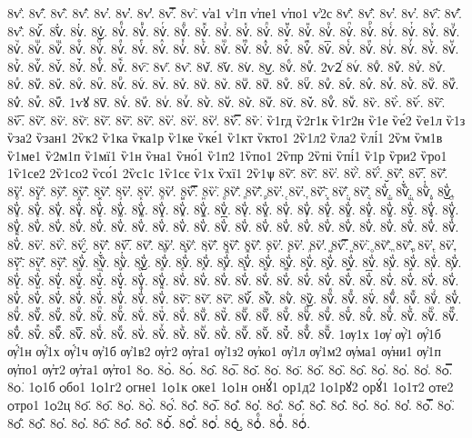 {8ѵ҆̈.
8ѵ҆̋.
8ѵ҆̏.
8ѵ҆̑.
8ѵ҆̓.
8ѵ҆̔.
8ѵ҆̾.
8ѵ҆̿.
8ѵ҆͘.
ѵ҆а1
ѵ҆1п
ѵ҆пе1
ѵ҆по1
ѵ҆2с
8ѵ҆҃.
8ѵ҆҄.
8ѵ҆҅.
8ѵ҆҆.
8ѵ҆҇.
8ѵ҆᷀.
8ѵ҆᷁.
8ѵ҆᷶.
8ѵ᷷҆.
8ѵ᷸҆.
8ѵ᷹҆.
8ѵ҆ⷠ.
8ѵ҆ⷡ.
8ѵ҆ⷢ.
8ѵ҆ⷣ.
8ѵ҆ⷤ.
8ѵ҆ⷥ.
8ѵ҆ⷦ.
8ѵ҆ⷧ.
8ѵ҆ⷨ.
8ѵ҆ⷩ.
8ѵ҆ⷪ.
8ѵ҆ⷫ.
8ѵ҆ⷬ.
8ѵ҆ⷭ.
8ѵ҆ⷮ.
8ѵ҆ⷯ.
8ѵ҆ⷰ.
8ѵ҆ⷱ.
8ѵ҆ⷲ.
8ѵ҆ⷳ.
8ѵ҆ⷴ.
8ѵ҆ⷵ.
8ѵ҆ⷶ.
8ѵ҆ⷷ.
8ѵ҆ⷸ.
8ѵ҆ⷹ.
8ѵ҆ⷺ.
8ѵ҆ⷻ.
8ѵ҆ⷼ.
8ѵ҆ⷽ.
8ѵ҆ⷾ.
8ѵ҆ⷿ.
8ѵ҆꙯.
8ѵ҆ꙴ.
8ѵ҆ꙵ.
8ѵ҆ꙶ.
8ѵ҆ꙷ.
8ѵ҆ꙸ.
8ѵ҆ꙹ.
8ѵ҆ꙺ.
8ѵ҆ꙻ.
8ѵ҆꙼.
8ѵ҆꙽.
8ѵ҆ꚞ.
8ѵ҆ꚟ.
8ѵ҇.
8ѵ᷀.
8ѵ᷁.
8ѵ᷶.
8ѵ᷷.
8ѵ᷸.
8ѵ᷹.
8ѵⷠ.
8ѵⷡ.
2ѵ2ⷢ
8ѵⷢ.
8ѵⷣ.
8ѵⷤ.
8ѵⷥ.
8ѵⷦ.
8ѵⷧ.
8ѵⷨ.
8ѵⷩ.
8ѵⷪ.
8ѵⷫ.
8ѵⷬ.
8ѵⷭ.
8ѵⷮ.
8ѵⷯ.
8ѵⷰ.
8ѵⷱ.
8ѵⷲ.
8ѵⷳ.
8ѵⷴ.
8ѵⷵ.
8ѵⷶ.
8ѵⷷ.
8ѵⷸ.
8ѵⷹ.
8ѵⷺ.
8ѵⷻ.
8ѵⷼ.
8ѵⷽ.
8ѵⷾ.
8ѵⷿ.
1ѵꙋ
8ѵ꙯.
8ѵꙴ.
8ѵꙵ.
8ѵꙶ.
8ѵꙷ.
8ѵꙸ.
8ѵꙹ.
8ѵꙺ.
8ѵꙻ.
8ѵ꙼.
8ѵ꙽.
8ѵꚞ.
8ѵꚟ.
8ѷ.
8ѷ̀.
8ѷ́.
8ѷ̂.
8ѷ̅.
8ѷ̆.
8ѷ̇.
8ѷ̈.
8ѷ̋.
8ѷ̏.
8ѷ̑.
8ѷ̓.
8ѷ̔.
8ѷ̾.
8ѷ̿.
8ѷ͘.
ѷ1гд
ѷ2г1к
ѷ1г2н
ѷ1е
ѷе́2
ѷе1л
ѷ1з
ѷза2
ѷзан1
2ѷк2
ѷ1ка
ѷка1р
ѷ1ке
ѷке́1
ѷ1кт
ѷкто1
2ѷ1л2
ѷла2
ѷлі́1
2ѷм
ѷм1в
ѷ1ме1
ѷ2м1п
ѷ1мї1
ѷ1н
ѷна1
ѷно́1
ѷ1п2
1ѷпо1
2ѷпр
2ѷпі
ѷпі́1
ѷ1р
ѷри2
ѷро1
1ѷ1се2
2ѷ1со2
ѷсо́1
2ѷс1с
1ѷ1сє
ѷ1х
ѷхї1
2ѷ1ѱ
8ѷ҃.
8ѷ҄.
8ѷ҅.
8ѷ҅̀.
8ѷ҅́.
8ѷ҅̂.
8ѷ҅̅.
8ѷ҅̆.
8ѷ҅̇.
8ѷ҅̈.
8ѷ҅̋.
8ѷ҅̏.
8ѷ҅̑.
8ѷ҅̓.
8ѷ҅̔.
8ѷ҅̾.
8ѷ҅̿.
8ѷ҅͘.
8ѷ҅҃.
8ѷ҅҄.
8ѷ҅҅.
8ѷ҅҆.
8ѷ҅҇.
8ѷ҅᷀.
8ѷ҅᷁.
8ѷ҅᷶.
8ѷ᷷҅.
8ѷ᷸҅.
8ѷ᷹҅.
8ѷ҅ⷠ.
8ѷ҅ⷡ.
8ѷ҅ⷢ.
8ѷ҅ⷣ.
8ѷ҅ⷤ.
8ѷ҅ⷥ.
8ѷ҅ⷦ.
8ѷ҅ⷧ.
8ѷ҅ⷨ.
8ѷ҅ⷩ.
8ѷ҅ⷪ.
8ѷ҅ⷫ.
8ѷ҅ⷬ.
8ѷ҅ⷭ.
8ѷ҅ⷮ.
8ѷ҅ⷯ.
8ѷ҅ⷰ.
8ѷ҅ⷱ.
8ѷ҅ⷲ.
8ѷ҅ⷳ.
8ѷ҅ⷴ.
8ѷ҅ⷵ.
8ѷ҅ⷶ.
8ѷ҅ⷷ.
8ѷ҅ⷸ.
8ѷ҅ⷹ.
8ѷ҅ⷺ.
8ѷ҅ⷻ.
8ѷ҅ⷼ.
8ѷ҅ⷽ.
8ѷ҅ⷾ.
8ѷ҅ⷿ.
8ѷ҅꙯.
8ѷ҅ꙴ.
8ѷ҅ꙵ.
8ѷ҅ꙶ.
8ѷ҅ꙷ.
8ѷ҅ꙸ.
8ѷ҅ꙹ.
8ѷ҅ꙺ.
8ѷ҅ꙻ.
8ѷ҅꙼.
8ѷ҅꙽.
8ѷ҅ꚞ.
8ѷ҅ꚟ.
8ѷ҆.
8ѷ҆̀.
8ѷ҆́.
8ѷ҆̂.
8ѷ҆̅.
8ѷ҆̆.
8ѷ҆̇.
8ѷ҆̈.
8ѷ҆̋.
8ѷ҆̏.
8ѷ҆̑.
8ѷ҆̓.
8ѷ҆̔.
8ѷ҆̾.
8ѷ҆̿.
8ѷ҆͘.
8ѷ҆҃.
8ѷ҆҄.
8ѷ҆҅.
8ѷ҆҆.
8ѷ҆҇.
8ѷ҆᷀.
8ѷ҆᷁.
8ѷ҆᷶.
8ѷ᷷҆.
8ѷ᷸҆.
8ѷ᷹҆.
8ѷ҆ⷠ.
8ѷ҆ⷡ.
8ѷ҆ⷢ.
8ѷ҆ⷣ.
8ѷ҆ⷤ.
8ѷ҆ⷥ.
8ѷ҆ⷦ.
8ѷ҆ⷧ.
8ѷ҆ⷨ.
8ѷ҆ⷩ.
8ѷ҆ⷪ.
8ѷ҆ⷫ.
8ѷ҆ⷬ.
8ѷ҆ⷭ.
8ѷ҆ⷮ.
8ѷ҆ⷯ.
8ѷ҆ⷰ.
8ѷ҆ⷱ.
8ѷ҆ⷲ.
8ѷ҆ⷳ.
8ѷ҆ⷴ.
8ѷ҆ⷵ.
8ѷ҆ⷶ.
8ѷ҆ⷷ.
8ѷ҆ⷸ.
8ѷ҆ⷹ.
8ѷ҆ⷺ.
8ѷ҆ⷻ.
8ѷ҆ⷼ.
8ѷ҆ⷽ.
8ѷ҆ⷾ.
8ѷ҆ⷿ.
8ѷ҆꙯.
8ѷ҆ꙴ.
8ѷ҆ꙵ.
8ѷ҆ꙶ.
8ѷ҆ꙷ.
8ѷ҆ꙸ.
8ѷ҆ꙹ.
8ѷ҆ꙺ.
8ѷ҆ꙻ.
8ѷ҆꙼.
8ѷ҆꙽.
8ѷ҆ꚞ.
8ѷ҆ꚟ.
8ѷ҇.
8ѷ᷀.
8ѷ᷁.
8ѷ᷶.
8ѷ᷷.
8ѷ᷸.
8ѷ᷹.
8ѷⷠ.
8ѷⷡ.
8ѷⷢ.
8ѷⷣ.
8ѷⷤ.
8ѷⷥ.
8ѷⷦ.
8ѷⷧ.
8ѷⷨ.
8ѷⷩ.
8ѷⷪ.
8ѷⷫ.
8ѷⷬ.
8ѷⷭ.
8ѷⷮ.
8ѷⷯ.
8ѷⷰ.
8ѷⷱ.
8ѷⷲ.
8ѷⷳ.
8ѷⷴ.
8ѷⷵ.
8ѷⷶ.
8ѷⷷ.
8ѷⷸ.
8ѷⷹ.
8ѷⷺ.
8ѷⷻ.
8ѷⷼ.
8ѷⷽ.
8ѷⷾ.
8ѷⷿ.
8ѷ꙯.
8ѷꙴ.
8ѷꙵ.
8ѷꙶ.
8ѷꙷ.
8ѷꙸ.
8ѷꙹ.
8ѷꙺ.
8ѷꙻ.
8ѷ꙼.
8ѷ꙽.
8ѷꚞ.
8ѷꚟ.
1ѹ1х
1ѹ҆
ѹ҆̀1
ѹ҆́1б
ѹ҆́1н
ѹ҆́1х
ѹ҆́1ч
ѹ҆1б
ѹ҆1в2
ѹ҆г2
ѹ҆га1
ѹ҆1з2
ѹ҆ко1
ѹ҆1л
ѹ҆1м2
ѹ҆ма1
ѹ҆ни1
ѹ҆1п
ѹ҆по1
ѹ҆т2
ѹ҆та1
ѹ҆то1
8ѻ.
8ѻ̀.
8ѻ́.
8ѻ̂.
8ѻ̅.
8ѻ̆.
8ѻ̇.
8ѻ̈.
8ѻ̋.
8ѻ̏.
8ѻ̑.
8ѻ̓.
8ѻ̔.
8ѻ̾.
8ѻ̿.
8ѻ͘.
1ѻ1б
ѻбо1
1ѻ1г2
ѻгне1
1ѻ1к
ѻке1
1ѻ1н
ѻнꙋ́1
ѻр1д2
1ѻ1рꙋ2
ѻрꙋ́1
1ѻ1т2
ѻте2
ѻтро1
1ѻ2ц
8ѻ҃.
8ѻ҄.
8ѻ҅.
8ѻ҅̀.
8ѻ҅́.
8ѻ҅̂.
8ѻ҅̅.
8ѻ҅̆.
8ѻ҅̇.
8ѻ҅̈.
8ѻ҅̋.
8ѻ҅̏.
8ѻ҅̑.
8ѻ҅̓.
8ѻ҅̔.
8ѻ҅̾.
8ѻ҅̿.
8ѻ҅͘.
8ѻ҅҃.
8ѻ҅҄.
8ѻ҅҅.
8ѻ҅҆.
8ѻ҅҇.
8ѻ҅᷀.
8ѻ҅᷁.
8ѻ҅᷶.
8ѻ᷷҅.
8ѻ᷸҅.
8ѻ᷹҅.
8ѻ҅ⷠ.
8ѻ҅ⷡ.
8ѻ҅ⷢ.
}

